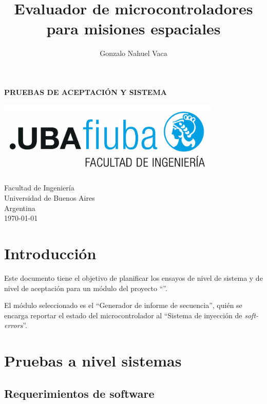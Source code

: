 \documentclass[
    11pt,
    spanish,
	a4paper
]{article}
\title{Evaluador de microcontroladores para misiones espaciales}
\author{Gonzalo Nahuel Vaca}
\def\doctype{PRUEBAS DE ACEPTACIÓN Y SISTEMA}
\begin{document}
\makeatletter
\begin{titlepage}
	\begin{center}
		\vspace*{1cm}
		
		\Huge
		\textbf{\doctype}
		
		\vspace{0.5cm}
		\LARGE
		\@title
		
		\vspace{1.5cm}
		
		\textbf{\@author}

		\vspace{3.5cm}

		\includegraphics[width=0.8\textwidth]{img/logoFIUBA.pdf}
		
		\vfill
		Facultad de Ingeniería\\
		Universidad de Buenos Aires\\
		Argentina\\
		\today
	\end{center}
\end{titlepage}
\makeatother
\newpage

\section{Introducción}
\label{sec:introduccion}

Este documento tiene el objetivo de planificar los ensayos de nivel de sistema y de nivel de aceptación para un módulo del proyecto ``\MyTitle''.

El módulo seleccionado es el ``Generador de informe de secuencia'', quién se encarga reportar el estado del microcontrolador al ``Sistema de inyección de \emph{soft-errors}''.

\section{Pruebas a nivel sistemas}
\label{sec:lvlsistema}

\subsection{Requerimientos de software}
\label{sub:reqsoftware}
\end{document}
